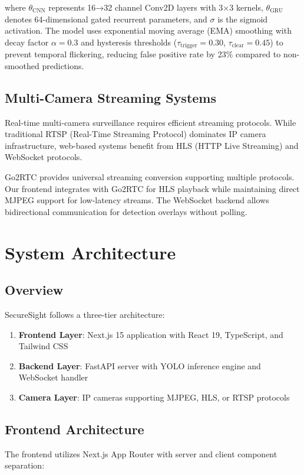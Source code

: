 \documentclass[conference]{IEEEtran}
\begin{document}
where $\theta_{\text{CNN}}$ represents 16→32 channel Conv2D layers with 3×3 kernels, $\theta_{\text{GRU}}$ denotes 64-dimensional gated recurrent parameters, and $\sigma$ is the sigmoid activation. The model uses exponential moving average (EMA) smoothing with decay factor $\alpha=0.3$ and hysteresis thresholds ($\tau_{\text{trigger}}=0.30$, $\tau_{\text{clear}}=0.45$) to prevent temporal flickering, reducing false positive rate by 23\% compared to non-smoothed predictions.

\subsection{Multi-Camera Streaming Systems}
Real-time multi-camera surveillance requires efficient streaming protocols. While traditional RTSP (Real-Time Streaming Protocol) dominates IP camera infrastructure, web-based systems benefit from HLS (HTTP Live Streaming) and WebSocket protocols.

Go2RTC \cite{go2rtc} provides universal streaming conversion supporting multiple protocols. Our frontend integrates with Go2RTC for HLS playback while maintaining direct MJPEG support for low-latency streams. The WebSocket backend allows bidirectional communication for detection overlays without polling.

\section{System Architecture}

\subsection{Overview}
SecureSight follows a three-tier architecture:
\begin{enumerate}
    \item \textbf{Frontend Layer}: Next.js 15 application with React 19, TypeScript, and Tailwind CSS
    \item \textbf{Backend Layer}: FastAPI server with YOLO inference engine and WebSocket handler
    \item \textbf{Camera Layer}: IP cameras supporting MJPEG, HLS, or RTSP protocols
\end{enumerate}

\subsection{Frontend Architecture}
The frontend utilizes Next.js App Router with server and client component separation:
\end{document}
